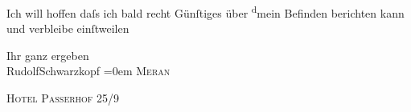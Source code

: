 \pstart
           Ich will hoffen daſs ich bald recht Günſtiges über \substVorne{}\textsuperscript{d}\substDazwischen{}m\substHinten{}ein Befinden berichten kann und verbleibe einſtweilen\pend
           
\pstart
           Ihr ganz ergeben{\\[\baselineskip]}\spacefill\mbox{RudolfSchwarzkopf}\pend
           \leftskip=0em{}
\pstart
           \noindent{}\textsc{Meran}\pend
           
\pstart
           \raggedleft{}\textsc{Hotel Paſſerhof}{ }25/9\pend
           \endnumbering{}
\begin{anhang}
\end{anhang}\newcommand{\dateiname}{L04276}\newcommand{\titel}{Rudolf Schwarzkopf an Arthur Schnitzler, 25. 9. 1893}\newcommand{\editorInnen}{Herausgegeben von Jahnke, SelmaMüller, Martin Anton}
